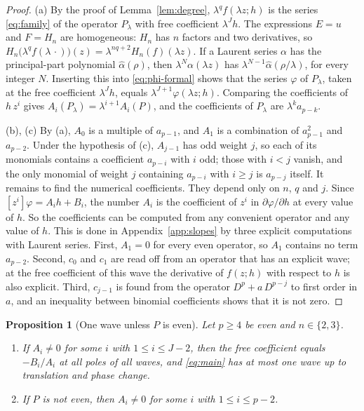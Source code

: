 \documentclass[11pt]{article}
\newtheorem{proposition}[theorem]{Proposition}
\theoremstyle{definition}
\theoremstyle{remark}
\numberwithin{equation}{section}
\newcommand{\hatt}[1]{\widehat{#1}}
\begin{document}
\begin{proof}
(a) By the proof of Lemma~\ref{lem:degree}, \(\lambda^qf(\lambda z;h)\)
is the series \eqref{eq:family} of the operator \(P_\lambda\) with
free coefficient \(\lambda^Jh\). The expressions \(E=u\) and \(F=H_n\)
are homogeneous: \(H_n\) has \(n\) factors and two derivatives, so
\(H_n\bigl(\lambda^qf(\lambda\,\cdot)\bigr)(z)
=\lambda^{nq+2}H_n(f)(\lambda z)\). If a Laurent series \(\alpha\) has the
principal-part polynomial \(\hatt\alpha(\rho)\), then
\(\lambda^N\alpha(\lambda z)\) has
\(\lambda^{N-1}\hatt\alpha(\rho/\lambda)\), for every integer \(N\).
Inserting this into \eqref{eq:phi-formal} shows that the series
\(\varphi\) of \(P_\lambda\), taken at the free coefficient
\(\lambda^Jh\), equals \(\lambda^{J+1}\varphi(\lambda z;h)\). Comparing
the coefficients of \(h\,z^i\) gives
\(A_i(P_\lambda)=\lambda^{i+1}A_i(P)\), and the coefficients of
\(P_\lambda\) are \(\lambda^ka_{p-k}\).

(b), (c) By (a), \(A_0\) is a multiple of \(a_{p-1}\), and \(A_1\) is a
combination of \(a_{p-1}^2\) and \(a_{p-2}\). Under the hypothesis of
(c), \(A_{j-1}\) has odd weight \(j\), so each of its monomials contains
a coefficient \(a_{p-i}\) with \(i\) odd; those with \(i<j\) vanish,
and the only monomial of weight \(j\) containing \(a_{p-i}\) with
\(i\ge j\) is \(a_{p-j}\) itself. It remains to find the numerical
coefficients. They depend only on \(n\), \(q\) and \(j\). Since
\([z^i]\varphi=A_ih+B_i\), the number \(A_i\) is the coefficient of
\(z^i\) in \(\partial\varphi/\partial h\) at every value of \(h\). So
the coefficients can be computed from any convenient operator and any
value of \(h\). This is done in
Appendix~\ref{app:slopes} by three explicit computations with Laurent
series. First, \(A_1=0\) for every even operator, so \(A_1\) contains
no term \(a_{p-2}\). Second, \(c_0\) and \(c_1\) are read off from an
operator that has an explicit wave; at the free coefficient of this
wave the derivative of \(f(z;h)\) with respect to \(h\) is also
explicit. Third, \(c_{j-1}\) is found from the operator
\(D^p+a\,D^{p-j}\) to first order in \(a\), and an inequality between
binomial coefficients shows that it is not zero.
\end{proof}

\begin{proposition}[One wave unless \(P\) is even]\label{prop:not-even}
Let \(p\ge4\) be even and \(n\in\{2,3\}\).
\begin{enumerate}[label=\textup{(\alph*)},leftmargin=2.2em]
\item If \(A_i\ne0\) for some \(i\) with \(1\le i\le J-2\), then the
free coefficient equals \(-B_i/A_i\) at all poles of all waves, and
\eqref{eq:main} has at most one wave up to translation and phase
change.
\item If \(P\) is not even, then \(A_i\ne0\) for some \(i\) with
\(1\le i\le p-2\).
\end{enumerate}
\end{proposition}
\end{document}
